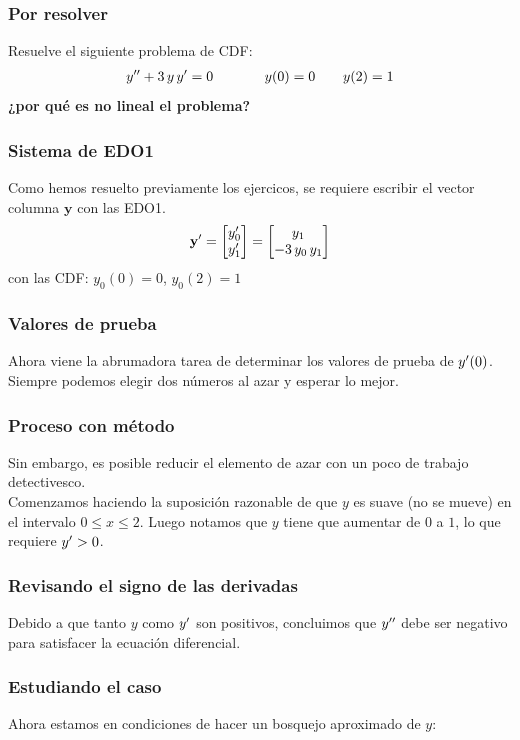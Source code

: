 \documentclass[12pt]{beamer}
\begin{document}
\begin{frame}
\frametitle{Por resolver}
Resuelve el siguiente problema de CDF:
\pause
\begin{align*}
{y}^{\prime \prime} + 3 \, y \, {y}^{\prime} = 0 \hspace{1.3cm} y (0) = 0 \hspace{0.7cm} y (2) = 1
\end{align*}
\pause
\textbf{¿por qué es no lineal el problema?}
\end{frame}
\begin{frame}
\frametitle{Sistema de EDO1}
Como hemos resuelto previamente los ejercicos, se requiere escribir el vector columna $\mathbf{y}$ con las EDO1.
\\
\bigskip
\pause
\begin{align*}
{\mathbf{y}}^{\prime} = \begin{bmatrix}
{y}^{\prime}_{0} \\
{y}^{\prime}_{1}
\end{bmatrix}
=
\begin{bmatrix}
y_{1} \\
- 3 \, y_{0} \, y_{1}
\end{bmatrix}
\end{align*}
con las CDF: $y_{0} (0) = 0$, $y_{0} (2) = 1$
\end{frame}
\begin{frame}
\frametitle{Valores de prueba}
Ahora viene la abrumadora tarea de determinar los valores de prueba de ${y}^{\prime} (0)$.
\\
\bigskip
\pause
Siempre podemos elegir dos números al azar y esperar lo mejor.
\end{frame}
\begin{frame}
\frametitle{Proceso con método}
Sin embargo, es posible reducir el elemento de azar con un poco de trabajo detectivesco.
\\
\bigskip
\pause
Comenzamos haciendo la suposición razonable de que $y$ es suave (no se mueve) en el intervalo $0 \leq x \leq 2$. Luego notamos que $y$ tiene que aumentar de $0$ a $1$, lo que requiere ${y}^{\prime} > 0$.
\end{frame}
\begin{frame}
\frametitle{Revisando el signo de las derivadas}
Debido a que tanto $y$ como ${y}^{\prime}$ son positivos, \pause concluimos que ${y}^{\prime \prime}$ debe ser negativo para satisfacer la ecuación diferencial.
\end{frame}
\begin{frame}
\frametitle{Estudiando el caso}
Ahora estamos en condiciones de hacer un bosquejo aproximado de $y$:
\pause
\begin{figure}
\centering
{}
\end{figure}
\end{frame}
\end{document}
